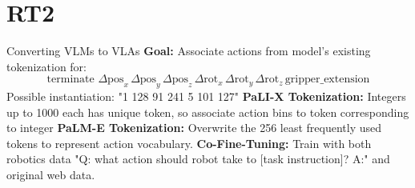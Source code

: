 \documentclass{beamer}
\begin{document}
\section{RT2}

\begin{frame}[t]{Converting VLMs to VLAs}
    \textbf{Goal:} Associate actions from model's existing tokenization for: \newline
    \[\text{terminate } \Delta \text{pos}_x \, \Delta \text{pos}_y \, \Delta \text{pos}_z \, \Delta \text{rot}_x \, \Delta \text{rot}_y \, \Delta \text{rot}_z \, \text{gripper\_extension}\]
    Possible instantiation: "1 128 91 241 5 101 127" \newline
    \newline
    \textbf{PaLI-X Tokenization:} Integers up to 1000 each has unique token, so associate action bins to token corresponding to integer \newline  
    \textbf{PaLM-E Tokenization:} Overwrite the 256 least frequently used tokens to represent action vocabulary.
    \newline
    \textbf{Co-Fine-Tuning:} Train with both robotics data "Q: what action should robot take to [task instruction]? A:" and original web data. \newline
\end{frame}
\end{document}

